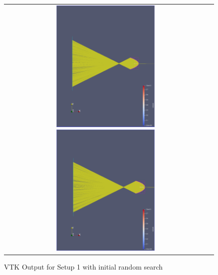 \documentclass[a4paper,10pt]{article}
\begin{document}
    \begin{figure}
        \centering
        \begin{tabular}{c c}
        \includegraphics[width=0.5\textwidth]{images/fixed_rand/start.png}
        \includegraphics[width=0.5\textwidth]{images/fixed_rand/0.png}
        \end{tabular}
        \label{fig:setup1_rand}
        \caption[VTK Output for Setup 1 with initial random search]{
            VTK Output for Setup 1 with initial random search
            }
    \end{figure}
\end{document}
